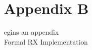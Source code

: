 %
%

\chapter{Appendix B}
\label{app:b}

egins an appendix\\

Formal RX Implementation












\